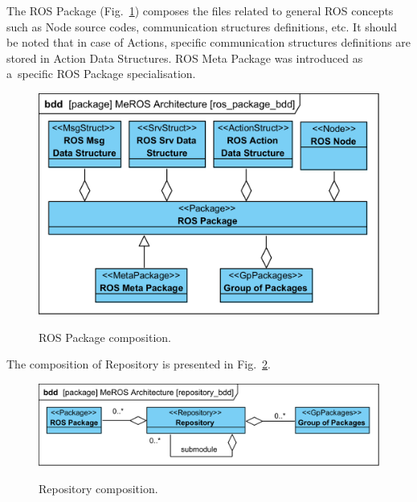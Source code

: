 \documentclass[11pt,oneside,a4paper]{report}
\begin{document}
	The ROS Package (Fig.~\ref{fig:ros_package_bdd}) composes the files related to general ROS concepts such as Node source codes, communication structures definitions, etc. It should be noted that in case of Actions, specific communication structures definitions are stored in Action Data Structures. ROS Meta Package was introduced as a~specific ROS Package specialisation.
	
	\begin{figure}[H]
		\centering
		\begin{center}
			{\includegraphics[scale=1.0]{diagrams/ros_package_bdd.png}}
		\end{center}
		\caption{ROS Package composition.} 
		\label{fig:ros_package_bdd}
	\end{figure}
		
		
%
	
The composition of Repository is presented in Fig.~\ref{fig:repository_bdd}.	
	
	\begin{figure}[H]
		\centering
		\begin{center}
			{\includegraphics[scale=1.0]{diagrams/repository_bdd.png}}
		\end{center}
		\caption{Repository composition.} 
		\label{fig:repository_bdd}
	\end{figure}
\end{document}
